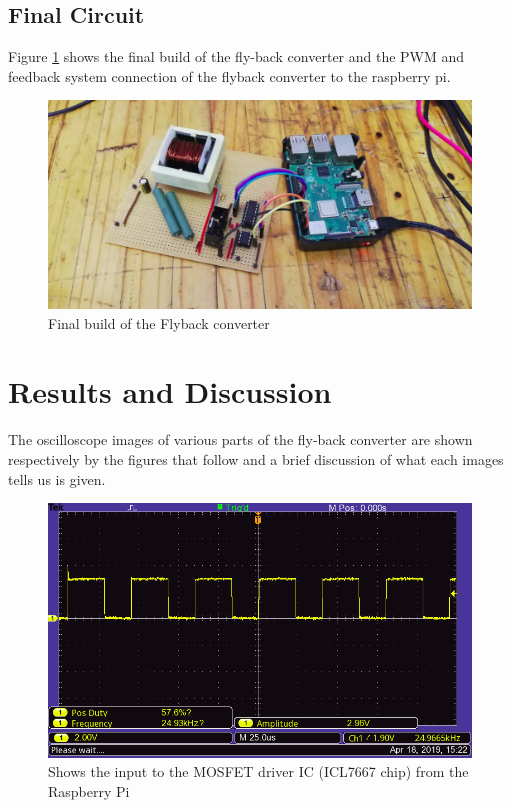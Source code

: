 \documentclass[a4paper, 12pt]{article}
\begin{document}
\subsection{Final Circuit}
Figure \ref{fig:flyback_converter_build} shows the final build of the fly-back
converter and the PWM and feedback system connection of the flyback converter
to the raspberry pi.
\begin{figure}[H]
  \centering
  \includegraphics[width=\textwidth]{images/final_circuit_image.png}
  \caption{Final build of the Flyback converter}
  \label{fig:flyback_converter_build}
\end{figure}


\section{Results and Discussion}
The oscilloscope images of various parts of the fly-back converter are shown respectively by the figures that follow and a brief discussion of what each images tells us is given.

\begin{figure}[H]
  \centering
  \includegraphics[width=\textwidth]{images/pwm_input_from_pi.png}
  \caption{Shows the input to the MOSFET driver IC (ICL7667 chip) from the Raspberry Pi}
  \label{fig:pwm_input_from_pi}
\end{figure}
\end{document}
